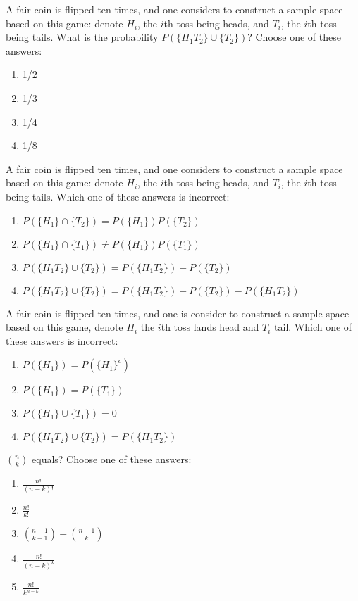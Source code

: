 \documentclass[poll_tutorial_format]{subfiles}
\begin{document}
	\begin{exercise}
		A fair coin is flipped ten times, and one considers to construct a sample space based on this game: denote $H_i$, the $i$th toss being heads, and $T_i$, the $i$th toss being tails. What is the probability $P( \{H_1T_2\} \cup \{T_2\} )$?
	Choose one of these answers:
	\begin{enumerate}
		\item 1/2
		\item 1/3
		\item 1/4
		\item 1/8
	\end{enumerate}
\end{exercise}

	\begin{exercise}
		A fair coin is flipped ten times, and one considers to construct a sample space based on this game: denote $H_i$, the $i$th toss being heads, and $T_i$, the $i$th toss being tails. 
	Which one of these answers is incorrect:
	\begin{enumerate}
		\item $P( \{H_1\} \cap \{T_2\} )=P( \{H_1\})P( \{T_2\} )$
		\item $P( \{H_1 \} \cap \{T_1\} )\neq  P( \{H_1\})P( \{T_1\} )$
		\item $P( \{H_1T_2\} \cup \{T_2\} )=P( \{H_1T_2\} )+P( \{T_2\} )$
		\item $P( \{H_1T_2\} \cup \{T_2\} )=P( \{H_1T_2\} )+P( \{T_2\} )-P( \{H_1T_2\} )$
	\end{enumerate}
\end{exercise}


	\begin{exercise}
	A fair coin is flipped ten times, and one is consider to construct a sample space based on this game, denote $H_i$ the $i$th toss lands head and $T_i$ tail. 
	Which one of these answers is incorrect:
	\begin{enumerate}
		\item $P( \{H_1\})=P( \{H_1\}^c)$
		\item $P( \{H_1 \} )=P( \{T_1\} )$
		\item $P( \{H_1\} \cup \{T_1\} )=0$
		\item $P( \{H_1T_2\} \cup \{T_2\} )=P( \{H_1T_2\} ) $
	\end{enumerate}
\end{exercise}


	
	\begin{exercise}
		${n\choose k}$ equals?
		Choose one of these answers:
		\begin{enumerate}
			\item $\frac{n!}{(n-k)!}$
			\item $\frac{n!}{k!}$
			\item ${n-1\choose k-1} +{n-1\choose k}$
			\item $\frac{n!}{(n-k)^k}$
			\item $\frac{n!}{k^{n-k}}$
		\end{enumerate}
	\end{exercise}
	
\end{document}
